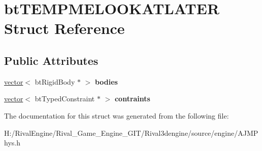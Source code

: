 \hypertarget{structbt_t_e_m_p_m_e_l_o_o_k_a_t_l_a_t_e_r}{}\section{bt\+T\+E\+M\+P\+M\+E\+L\+O\+O\+K\+A\+T\+L\+A\+T\+ER Struct Reference}
\label{structbt_t_e_m_p_m_e_l_o_o_k_a_t_l_a_t_e_r}
\subsection*{Public Attributes}
\begin{DoxyCompactItemize}
\item 
\mbox{\label{structbt_t_e_m_p_m_e_l_o_o_k_a_t_l_a_t_e_r_a31a2f7aa471ca04175f6d0957c5d9995}} 
\hyperlink{structvector}{vector}$<$ bt\+Rigid\+Body $\ast$ $>$ {\bfseries bodies}
\item 
\mbox{\label{structbt_t_e_m_p_m_e_l_o_o_k_a_t_l_a_t_e_r_abb9f2dbef2607b7693f09a9900a391ca}} 
\hyperlink{structvector}{vector}$<$ bt\+Typed\+Constraint $\ast$ $>$ {\bfseries contraints}
\end{DoxyCompactItemize}


The documentation for this struct was generated from the following file\+:\begin{DoxyCompactItemize}
\item 
H\+:/\+Rival\+Engine/\+Rival\+\_\+\+Game\+\_\+\+Engine\+\_\+\+G\+I\+T/\+Rival3dengine/source/engine/A\+J\+M\+Phys.\+h\end{DoxyCompactItemize}
